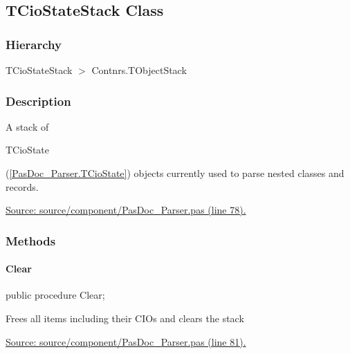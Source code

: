\documentclass{report}
\newif\ifpdf
\begin{document}
\subsection*{TCioStateStack Class}
\fi
\label{PasDoc_Parser.TCioStateStack}
\subsubsection*{\large{\textbf{Hierarchy}}\normalsize\hspace{1ex}\hfill}
TCioStateStack {$>$} Contnrs.TObjectStack
\subsubsection*{\large{\textbf{Description}}\normalsize\hspace{1ex}\hfill}
A stack of \begin{ttfamily}TCioState\end{ttfamily}(\ref{PasDoc_Parser.TCioState}) objects currently used to parse nested classes and records.\par
\href{https://github.com/pasdoc/pasdoc/blob/master/source/component/PasDoc_Parser.pas#L78}{Source: source/component/PasDoc{\_}Parser.pas (line 78).}\subsubsection*{\large{\textbf{Methods}}\normalsize\hspace{1ex}\hfill}
\paragraph*{Clear}\hspace*{\fill}

\label{PasDoc_Parser.TCioStateStack-Clear}
\begin{list}{}{
\setlength{\itemindent}{0cm}
\setlength{\listparindent}{0cm}
\setlength{\leftmargin}{\evensidemargin}
\addtolength{\leftmargin}{\tmplength}
\settowidth{\labelsep}{X}
\addtolength{\leftmargin}{\labelsep}
\setlength{\labelwidth}{\tmplength}
}
\item[\textbf{Declaration}\hfill]
\ifpdf
\begin{flushleft}
\fi
\begin{ttfamily}
public procedure Clear;\end{ttfamily}

\ifpdf
\end{flushleft}
\fi

\par
\item[\textbf{Description}]
Frees all items including their CIOs and clears the stack\par
\href{https://github.com/pasdoc/pasdoc/blob/master/source/component/PasDoc_Parser.pas#L81}{Source: source/component/PasDoc{\_}Parser.pas (line 81).}

\end{list}
\end{document}
